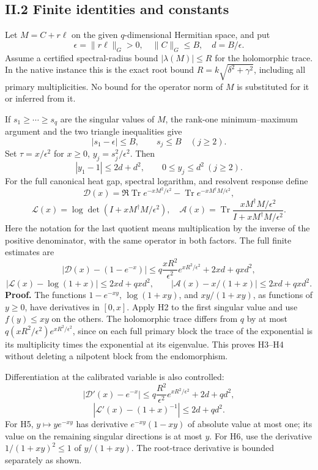 \documentclass[11pt]{article}
\begin{document}
\subsection{II.2 Finite identities and constants}\label{ii.2-finite-identities-and-constants}

Let \(M=C+r\ell\) on the given \(q\)-dimensional Hermitian space, and put \[
 \epsilon=\|r\ell\|_G>0,\quad \|C\|_G\le B,\quad
 d=B/\epsilon.
\] Assume a certified spectral-radius bound \(|\lambda(M)|\le R\) for the holomorphic trace. In the native instance this is the exact root bound \(R=k\sqrt{\delta^2+\gamma^2}\), including all primary multiplicities. No bound for the operator norm of \(M\) is substituted for it or inferred from it.

If \(s_1\ge\cdots\ge s_q\) are the singular values of \(M\), the rank-one minimum--maximum argument and the two triangle inequalities give \[
 |s_1-\epsilon|\le B,\qquad s_j\le B\quad(j\ge2).
 \tag{H1}
\] Set \(\tau=x/\epsilon^2\) for \(x\ge0\), \(y_j=s_j^2/\epsilon^2\). Then \[
 |y_1-1|\le2d+d^2,\qquad 0\le y_j\le d^2\ (j\ge2).
 \tag{H2}
\] For the full canonical heat gap, spectral logarithm, and resolvent response define \[
 \mathcal D(x)=\Re\operatorname{Tr}e^{-xM^2/\epsilon^2}
                  -\operatorname{Tr}e^{-xM^\dagger M/\epsilon^2},
\] \[
 \mathcal L(x)=\log\det(I+xM^\dagger M/\epsilon^2),\quad
 \mathcal A(x)=\operatorname{Tr}\frac{xM^\dagger M/\epsilon^2}
                                      {I+xM^\dagger M/\epsilon^2}.
\] Here the notation for the last quotient means multiplication by the inverse of the positive denominator, with the same operator in both factors. The full finite estimates are \[
 \boxed{|\mathcal D(x)-(1-e^{-x})|
 \le q\frac{xR^2}{\epsilon^2}e^{xR^2/\epsilon^2}
             +2xd+qx d^2,}
 \tag{H3}
\] \[
 \boxed{|\mathcal L(x)-\log(1+x)|\le2xd+qx d^2,\qquad
 |\mathcal A(x)-x/(1+x)|\le2xd+qx d^2.}
 \tag{H4}
\] \textbf{Proof.} The functions \(1-e^{-xy}\), \(\log(1+xy)\), and \(xy/(1+xy)\), as functions of \(y\ge0\), have derivatives in \([0,x]\). Apply H2 to the first singular value and use \(f(y)\le xy\) on the others. The holomorphic trace differs from \(q\) by at most \(q(xR^2/\epsilon^2)e^{xR^2/\epsilon^2}\), since on each full primary block the trace of the exponential is its multiplicity times the exponential at its eigenvalue. This proves H3--H4 without deleting a nilpotent block from the endomorphism.

Differentiation at the calibrated variable is also controlled: \[
 \boxed{|\mathcal D'(x)-e^{-x}|
 \le q\frac{R^2}{\epsilon^2}e^{xR^2/\epsilon^2}+2d+qd^2,}
 \tag{H5}
\] \[
 \boxed{|\mathcal L'(x)-(1+x)^{-1}|\le2d+qd^2.}
 \tag{H6}
\] For H5, \(y\mapsto y e^{-xy}\) has derivative \(e^{-xy}(1-xy)\) of absolute value at most one; its value on the remaining singular directions is at most \(y\). For H6, use the derivative \(1/(1+xy)^2\le1\) of \(y/(1+xy)\). The root-trace derivative is bounded separately as shown.
\end{document}
